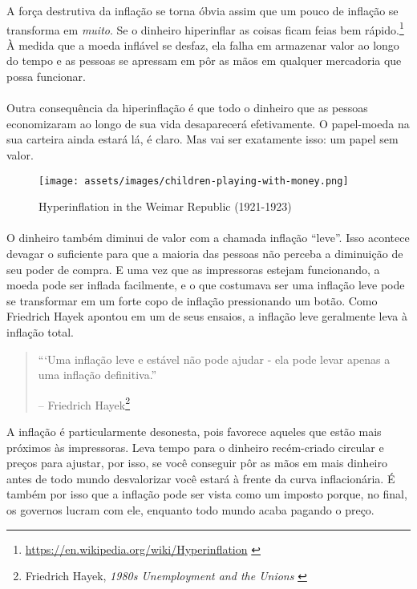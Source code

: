A força destrutiva da inflação se torna óbvia assim que um pouco de inflação se 
transforma em \textit{muito}. Se o dinheiro hiperinflar as coisas ficam feias bem  
rápido.\footnote{\url{https://en.wikipedia.org/wiki/Hyperinflation}
\cite{wiki:hyperinflation}} À medida que a moeda inflável se desfaz, 
ela falha em armazenar valor ao longo do tempo e as pessoas se apressam em pôr 
as mãos em qualquer mercadoria que possa funcionar.

\paragraph{}
Outra consequência da hiperinflação é que todo o dinheiro que as pessoas economizaram 
ao longo de sua vida desaparecerá efetivamente. O papel-moeda na sua carteira ainda 
estará lá, é claro. Mas vai ser exatamente isso: um papel sem valor.

\begin{figure}
  \texttt{[image: assets/images/children-playing-with-money.png]}
  \caption{Hyperinflation in the Weimar Republic (1921-1923)}
  \label{fig:children-playing-with-money}
\end{figure}

\paragraph{}
O dinheiro também diminui de valor com a chamada inflação \enquote{leve}. 
Isso acontece devagar o suficiente para que a maioria das pessoas não 
perceba a diminuição de seu poder de compra. E uma vez que as impressoras 
estejam funcionando, a moeda pode ser inflada facilmente, e o que costumava 
ser uma inflação leve pode se transformar em um forte copo de inflação 
pressionando um botão. 
Como Friedrich Hayek apontou em um de seus ensaios, a inflação leve geralmente 
leva à inflação total.

\begin{quotation}\begin{samepage}
\enquote{`Uma inflação leve e estável não pode ajudar - ela pode levar apenas a uma inflação definitiva.}
\begin{flushright} -- Friedrich Hayek\footnote{Friedrich Hayek, \textit{1980s
Unemployment and the Unions} \cite{hayek-inflation}}
\end{flushright}\end{samepage}\end{quotation}

A inflação é particularmente desonesta, pois favorece aqueles que estão mais próximos
às impressoras. Leva tempo para o dinheiro recém-criado
circular e preços para ajustar, por isso, se você conseguir pôr as mãos em 
mais dinheiro antes de todo mundo desvalorizar você estará à frente da
curva inflacionária. É também por isso que a inflação pode ser vista como um
imposto porque, no final, os governos lucram com ele, enquanto todo mundo acaba pagando o preço.

